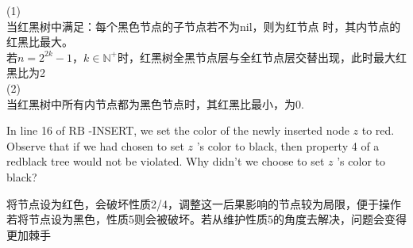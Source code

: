 \documentclass[a4paper, justified]{tufte-handout}
\begin{document}
\begin{solution}
  (1)\\
  当红黑树中满足：每个黑色节点的子节点若不为nil，则为红节点  时，其内节点的红黑比最大。\\
  若$n=2^{2k}-1$，$k\in \mathbb{N^+}$时，红黑树全黑节点层与全红节点层交替出现，此时最大红黑比为2\\
  (2)\\
  当红黑树中所有内节点都为黑色节点时，其红黑比最小，为0.
\end{solution}

\begin{problem}[2-15.3 TC 13.3-1]
In line 16 of $\mathrm{RB}$ -INSERT, we set the color of the newly inserted node $z$ to red. Observe that if we had chosen to set $z$ 's color to black, then property 4 of a redblack tree would not be violated. Why didn't we choose to set $z$ 's color to black?
\end{problem}

\begin{solution}
  将节点设为红色，会破坏性质2/4，调整这一后果影响的节点较为局限，便于操作\\
  若将节点设为黑色，性质5则会被破坏。若从维护性质5的角度去解决，问题会变得更加棘手
\end{solution}

\beginfb

% 
% 
\end{document}
